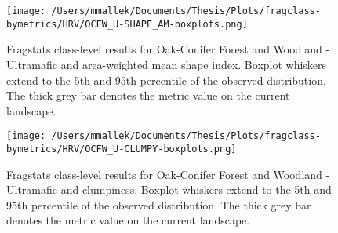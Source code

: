 \begin{figure}[!htbp]
\centering
    \texttt{[image: /Users/mmallek/Documents/Thesis/Plots/fragclass-bymetrics/HRV/OCFW\_U-SHAPE\_AM-boxplots.png]}
  \caption{Fragstats class-level results for Oak-Conifer Forest and Woodland - Ultramafic and area-weighted mean shape index. Boxplot whiskers extend to the 5th and 95th percentile of the observed distribution. The thick grey bar denotes the metric value on the current landscape.}
  \label{fig:ocfwu_shapeam}
\end{figure}


\begin{figure}[!htbp]
\centering
    \texttt{[image: /Users/mmallek/Documents/Thesis/Plots/fragclass-bymetrics/HRV/OCFW\_U-CLUMPY-boxplots.png]}
  \caption{Fragstats class-level results for Oak-Conifer Forest and Woodland - Ultramafic and clumpiness. Boxplot whiskers extend to the 5th and 95th percentile of the observed distribution. The thick grey bar denotes the metric value on the current landscape.}
  \label{fig:ocfwu_clumpy}
\end{figure}

